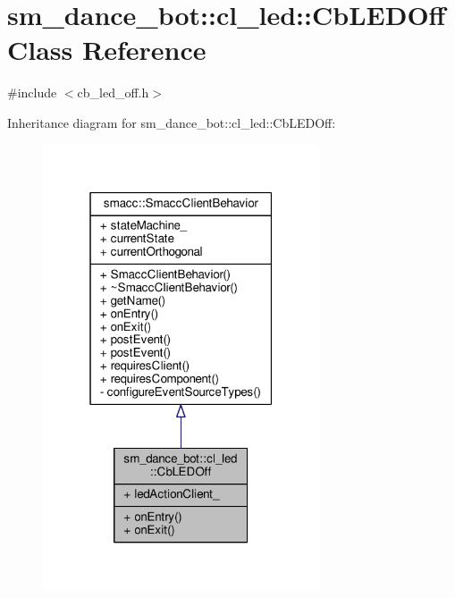 \hypertarget{classsm__dance__bot_1_1cl__led_1_1CbLEDOff}{}\section{sm\+\_\+dance\+\_\+bot\+:\+:cl\+\_\+led\+:\+:Cb\+L\+E\+D\+Off Class Reference}
\label{classsm__dance__bot_1_1cl__led_1_1CbLEDOff}


{\ttfamily \#include $<$cb\+\_\+led\+\_\+off.\+h$>$}



Inheritance diagram for sm\+\_\+dance\+\_\+bot\+:\+:cl\+\_\+led\+:\+:Cb\+L\+E\+D\+Off\+:\nopagebreak
\begin{figure}[H]
\begin{center}
\leavevmode
\includegraphics[width=232pt]{classsm__dance__bot_1_1cl__led_1_1CbLEDOff__inherit__graph}
\end{center}
\end{figure}


